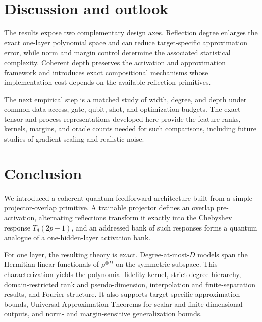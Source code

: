 \documentclass[pdflatex,sn-mathphys,NameDate,iicol]{sn-jnl}
\begin{document}
\section{Discussion and outlook}
\label{sec:discussion}

The results expose two complementary design axes. Reflection degree enlarges
the exact one-layer polynomial space and can reduce target-specific
approximation error, while norm and margin control determine the associated
statistical complexity. Coherent depth preserves the activation and
approximation framework and introduces exact compositional mechanisms whose
implementation cost depends on the available reflection primitives.

The next empirical step is a matched study of width, degree, and depth under
common data access, gate, qubit, shot, and optimization budgets. The exact
tensor and process representations developed here provide the feature ranks,
kernels, margins, and oracle counts needed for such comparisons, including
future studies of gradient scaling and realistic noise.

\section{Conclusion}

We introduced a coherent quantum feedforward architecture built from a simple
projector-overlap primitive. A trainable projector defines an overlap
pre-activation, alternating reflections transform it exactly into the
Chebyshev response $T_d(2p-1)$, and an addressed bank of such responses forms
a quantum analogue of a one-hidden-layer activation bank.

For one layer, the resulting theory is exact. Degree-at-most-$D$ models span
the Hermitian linear functionals of $\rho^{\otimes D}$ on the symmetric
subspace. This characterization yields the polynomial-fidelity kernel, strict
degree hierarchy, domain-restricted rank and pseudo-dimension, interpolation
and finite-separation results, and Fourier structure. It also supports
target-specific approximation bounds, Universal Approximation Theorems for
scalar and finite-dimensional outputs, and norm- and margin-sensitive
generalization bounds.
\end{document}

